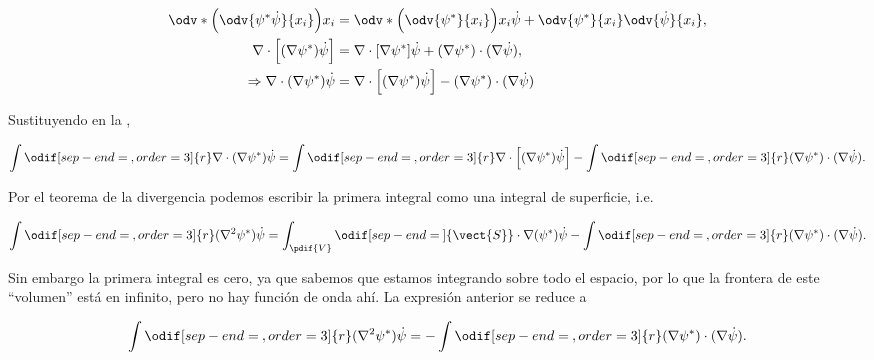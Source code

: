 \documentclass[../main.tex]{subfiles}
\begin{document}
\begin{align*}
	\odv*{\Bigl(\odv{\psi^{*}\dot{\psi}}{x_{i}}\Bigr)}{x_{i}} & = \odv*{\Bigl(\odv{\psi^{*}}{x_{i}}\Bigr)}{x_{i}}\dot{\psi} +
	\odv{\psi^{*}}{x_{i}}\odv{\dot{\psi}}{x_{i}},                                                                                                                      \\
	\nabla \cdot{\Bigl[(\nabla{\psi^{*}})\dot{\psi}\Bigr]}    & =
	\nabla \cdot{[\nabla{\psi^{*}}]}\dot{\psi} + (\nabla{\psi^{*}})\cdot(\nabla{\dot{\psi}}),                                                                          \\
	\Rightarrow	\nabla \cdot{(\nabla{\psi^{*}})}\dot{\psi}    & = \nabla \cdot{\Bigl[(\nabla{\psi^{*}})\dot{\psi}\Bigr]} - (\nabla{\psi^{*}})\cdot(\nabla{\dot{\psi}})
\end{align*}

Sustituyendo en la ,

\begin{equation*}
	\int \odif[sep-end=\medspace, order = 3]{r} \nabla \cdot{(\nabla{\psi^{*}})}\dot{\psi} =
	\int \odif[sep-end=\medspace, order = 3]{r} \nabla \cdot{\Bigl[(\nabla{\psi^{*}})\dot{\psi}\Bigr]} -
	\int \odif[sep-end=\medspace, order = 3]{r} (\nabla{\psi^{*}})\cdot(\nabla{\dot{\psi}}).
\end{equation*}

Por el teorema de la divergencia podemos escribir la primera
integral como una integral de superficie, i.e.

\begin{equation}
	\int \odif[sep-end=\medspace, order = 3]{r} (\nabla^{2}{\psi^{*}})\dot{\psi} = \int_{\pdif{V}}\odif[sep-end=\medspace]{\vect{S}} \cdot \nabla{(\psi^{*})}\dot{\psi} - \int \odif[sep-end=\medspace, order = 3]{r} (\nabla{\psi^{*}})\cdot(\nabla{\dot{\psi}}).
	\label{eq:int-laplacian}
\end{equation}

Sin embargo la primera integral es cero, ya que sabemos que estamos integrando
sobre todo el espacio, por lo que la frontera de este ``volumen'' está en infinito,
pero no hay función de onda ahí. La expresión anterior se reduce a

\begin{equation}
	\int \odif[sep-end=\medspace, order = 3]{r} (\nabla^{2}{\psi^{*}})\dot{\psi} = - \int \odif[sep-end=\medspace, order = 3]{r} (\nabla{\psi^{*}})\cdot(\nabla{\dot{\psi}}).
	\label{eq:product-grads}
\end{equation}
\end{document}
